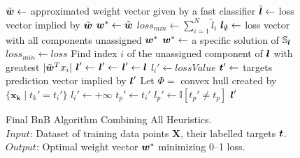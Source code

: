 \begin{figure}
\caption{
Final BnB Algorithm Combining All Heuristics. \\
\text{\hspace{2.15cm}} $Input$: Dataset of training data points $ \boldsymbol{X}$, their labelled targets $\boldsymbol{t}$. \\
\text{\hspace{2.15cm}} $Output$: Optimal weight vector $\boldsymbol{w}^*$ minimizing 0--1 loss.
}
\label{alg:BnB.Final}
\begin{algorithmic}[1]
\State $\tilde{\boldsymbol{w}} \gets $ approximated weight vector given by a fast classifier
\State $\tilde{\boldsymbol{l}} \gets $ loss vector implied by $\tilde{\boldsymbol{w}}$
\State $\boldsymbol{w}^* \gets \tilde{\boldsymbol{w}}$
\State $loss_{min} \gets \sum_{i=1}^N \tilde{l}_i$ 
\State $\boldsymbol{l}_\emptyset \gets $ loss vector with all components unassigned
\State {}
\State \Return $\boldsymbol{w}^*$
\Statex
{}
      \State $\boldsymbol{w}^* \gets$ a specific solution of $\mathbb{S}_{\boldsymbol{l}}$ 
      \State $loss_{min} \gets loss$
   \Else
      \State Find index $i$ of the unassigned component of $\boldsymbol{l}$ with greatest $|\tilde{\boldsymbol{w}}^Tx_i|$
      \State $\boldsymbol{l}' \gets$ 
         \State {}
      \EndIf
      \State $\boldsymbol{l}' \gets$ 
         \State {}
      \EndIf
   \EndIf
\EndProcedure
\Statex
{} 
   \State $\boldsymbol{l}' \gets \boldsymbol{l}$
   \State $l_i' \gets lossValue$   
   \State $\boldsymbol{t}' \gets $ targets prediction vector implied by $\boldsymbol{l}'$ 
   \State Let $\Phi =$ convex hull created by $\{ \boldsymbol{x_k} \; | \; t_k'=t_i' \}$ 
      \State $l_i' \gets +\infty$ 
   \Else
         \State $t_p' \gets t_i'$ 
         \State $l_p' \gets \mathbb{I} [t_p' \not= t_p]$
      \EndIf
   \EndFor
   \EndIf  
   \State \Return $\boldsymbol{l}'$
\EndFunction
\Statex
\EndFunction
\end{algorithmic}
\end{figure}

